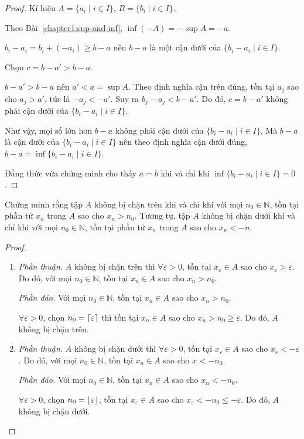\documentclass[class=analysis,crop=false]{standalone}
\begin{document}
\begin{proof}
    Kí hiệu $A = \{ a_{i} \mid i\in I \}$, $B = \{ b_{i} \mid i\in I \}$.
    \par Theo Bài~\ref{chapter1:sup-and-inf}, $\inf(-A) = -\sup A = -a$.
    \par $b_{i} - a_{i} = b_{i} + (-a_{i}) \ge b - a$ nên $b - a$ là một cận dưới của $\{ b_{i} - a_{i}\mid i\in I \}$.
    \par Chọn $c = b - a' > b - a$.
    \par $b - a' > b - a$ nên $a' < a = \sup A$. Theo định nghĩa cận trên đúng, tồn tại $a_{j}$ sao cho $a_{j} > a'$, tức là $-a_{j} < -a'$. Suy ra $b_{j} - a_{j} < b - a'$. Do đó, $c = b - a'$ không phải cận dưới của $\{ b_{i} - a_{i} \mid i\in I \}$.
    \par Như vậy, mọi số lớn hơn $b - a$ không phải cận dưới của $\{ b_{i} - a_{i}\mid i\in I \}$. Mà $b - a$ là cận dưới của $\{ b_{i} - a_{i} \mid i\in I \}$ nên theo định nghĩa cận dưới đúng, $b - a = \inf\{ b_{i} - a_{i} \mid i\in I \}$.
    \par Đẳng thức vừa chứng minh cho thấy $a = b$ khi và chỉ khi $\inf\{ b_{i} - a_{i} \mid i\in I \} = 0$.
\end{proof}

\begin{exercise}
    Chứng minh rằng tập $A$ không bị chặn trên khi và chỉ khi với mọi $n_{0}\in\mathbb{N}$, tồn tại phần tử $x_{n}$ trong $A$ sao cho $x_{n} > n_{0}$. Tương tự, tập $A$ không bị chặn dưới khi và chỉ khi với mọi $n_{0}\in\mathbb{N}$, tồn tại phần tử $x_{n}$ trong $A$ sao cho $x_{n} < -n$.
\end{exercise}

\begin{proof}
    \begin{enumerate}[label = (\roman*)]
        \item \textit{Phần thuận.} $A$ không bị chặn trên thì $\forall\varepsilon > 0$, tồn tại $x_{\varepsilon}\in A$ sao cho $x_{\varepsilon} > \varepsilon$. Do đó, với mọi $n_{0}\in\mathbb{N}$, tồn tại $x_{n}\in A$ sao cho $x_{n} > n_{0}$.
            \par \textit{Phần đảo.} Với mọi $n_{0}\in\mathbb{N}$, tồn tại $x_{n}\in A$ sao cho $x_{n} > n_{0}$.
            \par $\forall\varepsilon > 0$, chọn $n_{0} = \left\lceil{\varepsilon}\right\rceil$ thì tồn tại $x_{n}\in A$ sao cho $x_{n} > n_{0} \ge \varepsilon$. Do đó, $A$ không bị chặn trên.
        \item \textit{Phần thuận.} $A$ không bị chặn dưới thì $\forall\varepsilon > 0$, tồn tại $x_{\varepsilon}\in A$ sao cho $x_{\varepsilon} < -\varepsilon$. Do đó, với mọi $n_{0}\in\mathbb{N}$, tồn tại $x_{n}\in A$ sao cho $x_{} < -n_{0}$.
            \par \textit{Phần đảo.} Với mọi $n_{0}\in\mathbb{N}$, tồn tại $x_{n}\in A$ sao cho $x_{n} < -n_{0}$.
            \par $\forall\varepsilon > 0$, chọn $n_{0} = \left\lfloor{\varepsilon}\right\rfloor$, tồn tại $x_{\varepsilon}\in A$ sao cho $x_{\varepsilon} < -n_{0} \le -\varepsilon$. Do đó, $A$ không bị chặn dưới.
    \end{enumerate}
\end{proof}
\end{document}
